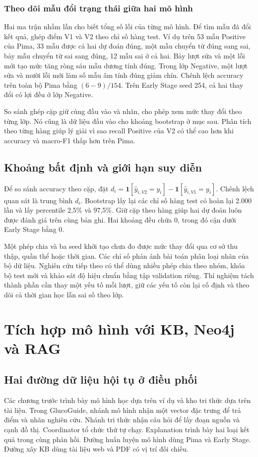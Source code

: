 \subsection{Theo dõi mẫu đổi trạng thái giữa hai mô hình}

Hai ma trận nhầm lẫn cho biết tổng số lỗi của từng mô hình. Để tìm mẫu đã đổi kết quả, ghép điểm V1 và V2 theo chỉ số hàng test. Ví dụ trên 53 mẫu Positive của Pima, 33 mẫu được cả hai dự đoán đúng, một mẫu chuyển từ đúng sang sai, bảy mẫu chuyển từ sai sang đúng, 12 mẫu sai ở cả hai. Bảy lượt sửa và một lỗi mới tạo mức tăng ròng sáu mẫu dương tính đúng. Trong lớp Negative, một lượt sửa và mười lỗi mới làm số mẫu âm tính đúng giảm chín. Chênh lệch accuracy trên toàn bộ Pima bằng \((6-9)/154\). Trên Early Stage seed 254, cả hai thay đổi có lợi đều ở lớp Negative.

So sánh ghép cặp giữ cùng đầu vào và nhãn, cho phép xem mức thay đổi theo từng lớp. Nó cũng là dữ liệu đầu vào cho khoảng bootstrap ở mục sau. Phân tích theo từng hàng giúp lý giải vì sao recall Positive của V2 có thể cao hơn khi accuracy và macro-F1 thấp hơn trên Pima.

\section{Khoảng bất định và giới hạn suy diễn}
Để so sánh accuracy theo cặp, đặt \(d_i=\mathbf{1}[\hat{y}_{i,V2}=y_i]-\mathbf{1}[\hat{y}_{i,V1}=y_i]\). Chênh lệch quan sát là trung bình \(d_i\). Bootstrap lấy lại các chỉ số hàng test có hoàn lại 2.000 lần và lấy percentile 2,5\% và 97,5\%. Giữ cặp theo hàng giúp hai dự đoán luôn được đánh giá trên cùng bản ghi. Hai khoảng đều chứa 0, trong đó cận dưới Early Stage bằng 0.

Một phép chia và ba seed khởi tạo chưa đo được mức thay đổi qua cơ sở thu thập, quần thể hoặc thời gian. Các chỉ số phản ánh bài toán phân loại nhãn của bộ dữ liệu. Nghiên cứu tiếp theo có thể dùng nhiều phép chia theo nhóm, khóa bộ test mới và khảo sát độ hiệu chuẩn bằng tập validation riêng. Thí nghiệm tách thành phần cần thay một yếu tố mỗi lượt, giữ các yếu tố còn lại cố định và theo dõi cả thời gian học lẫn sai số theo lớp.

\chapter{Tích hợp mô hình với KB, Neo4j và RAG}\label{ch:v2-agents}

\section{Hai đường dữ liệu hội tụ ở điều phối}
Các chương trước trình bày mô hình học dựa trên ví dụ và kho tri thức dựa trên tài liệu. Trong GlucoGuide, nhánh mô hình nhận một vector đặc trưng để trả điểm và nhãn nghiên cứu. Nhánh tri thức nhận câu hỏi để lấy đoạn nguồn và cạnh đồ thị. Coordinator tổ chức thứ tự chạy. Explanation trình bày hai loại kết quả trong cùng phản hồi. Đường huấn luyện mô hình dùng Pima và Early Stage. Đường xây KB dùng tài liệu web và PDF có vị trí đối chiếu.

